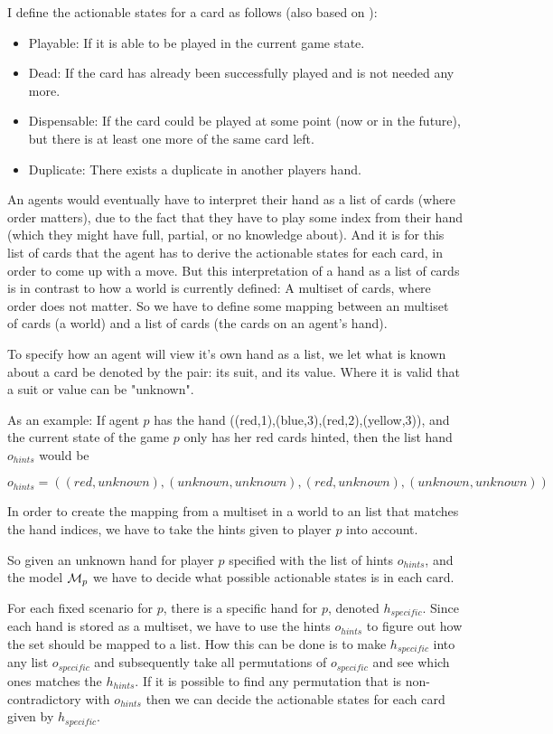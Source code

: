I define the actionable states for a card as follows (also based on \cite{CoxEtAl2015}):
\begin{itemize}
	\item Playable: If it is able to be played in the current game state.
	\item Dead: If the card has already been successfully played and is not needed any more.
	\item Dispensable: If the card could be played at some point (now or in the future), but there is at least one more of the same card left.
	\item Duplicate: There exists a duplicate in another players hand.
\end{itemize}
An agents would eventually have to interpret their hand as a list of cards (where order matters),
due to the fact that they have to play some index from their hand (which they might have full, partial, or no knowledge about).
And it is for this list of cards that the agent has to derive the actionable states for each card, in order to come up with a move.
But this interpretation of a hand as a list of cards is in contrast to how a world is currently defined: A multiset of cards, where order does not matter.
So we have to define some mapping between an multiset of cards (a world) and a list of cards (the cards on an agent's hand).

To specify how an agent will view it's own hand as a list, we let what is known about a card be denoted by the pair: its suit, and its value. Where it is valid that a suit or value can be "unknown".

As an example: If agent $p$ has the hand ((red,1),(blue,3),(red,2),(yellow,3)), and the current state of the game $p$ only has her red cards hinted, then the list hand $o_{hints}$ would be

\[o_{hints} = ((red,unknown),(unknown,unknown),(red,unknown),(unknown,unknown))\]

In order to create the mapping from a multiset in a world to an list that matches the hand indices, we have to take the hints given to player $p$ into account.

So given an unknown hand for player $p$ specified with the list of hints $o_{hints}$, and the model $\mathcal{M}_p$ we have to decide what possible actionable states is in each card. 

For each fixed scenario for $p$, there is a specific hand for $p$, denoted $h_{specific}$.
Since each hand is stored as a multiset, we have to use the hints $o_{hints}$ to figure out how the set should be mapped to a list.
How this can be done is to make $h_{specific}$ into any list $o_{specific}$ and subsequently take all permutations of $o_{specific}$ and see which ones matches the $h_{hints}$.
If it is possible to find any permutation that is non-contradictory with $o_{hints}$ then we can decide the actionable states for each card given by $h_{specific}$.

